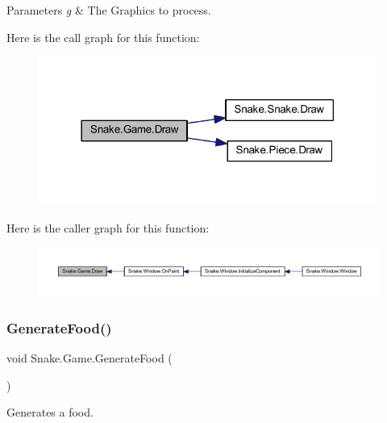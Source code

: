 \begin{DoxyParams}{Parameters}
{\em g} & The Graphics to process. \\
\hline
\end{DoxyParams}
Here is the call graph for this function\+:
\nopagebreak
\begin{figure}[H]
\begin{center}
\leavevmode
\includegraphics[width=314pt]{d5/d72/class_snake_1_1_game_ada55759091b780f152f7e4c362888ae2_cgraph}
\end{center}
\end{figure}
Here is the caller graph for this function\+:
\nopagebreak
\begin{figure}[H]
\begin{center}
\leavevmode
\includegraphics[width=350pt]{d5/d72/class_snake_1_1_game_ada55759091b780f152f7e4c362888ae2_icgraph}
\end{center}
\end{figure}
\mbox{\label{class_snake_1_1_game_ad398a631e2e19d4782c0904ed1af1052}} 
\subsubsection{\texorpdfstring{Generate\+Food()}{GenerateFood()}}
{\footnotesize\ttfamily void Snake.\+Game.\+Generate\+Food (\begin{DoxyParamCaption}{ }\end{DoxyParamCaption})\hspace{0.3cm}{\ttfamily [private]}}



Generates a food. 

